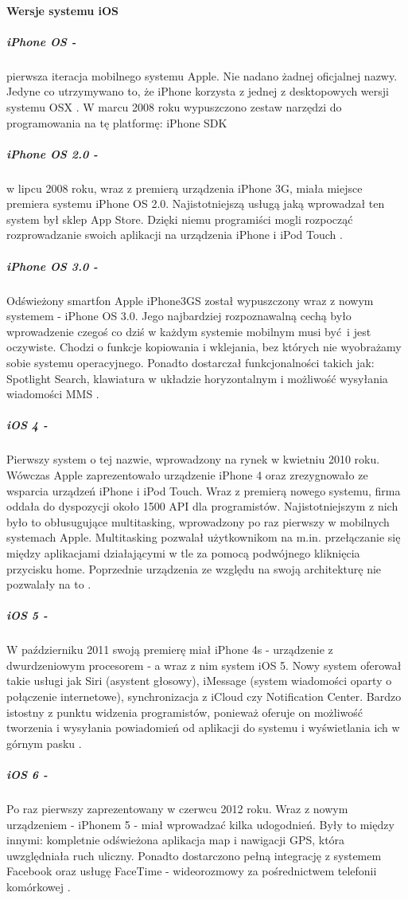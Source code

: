 \documentclass[12pt,oneside,a4paper]{report}
\begin{document}
\paragraph{Wersje systemu iOS}
\subparagraph{iPhone OS -}pierwsza iteracja mobilnego systemu Apple. Nie nadano żadnej oficjalnej nazwy. Jedyne co utrzymywano to, że iPhone korzysta z jednej z desktopowych wersji systemu OSX \cite{iphoneOSX}. 
W marcu 2008 roku wypuszczono zestaw narzędzi do programowania na tę platformę: iPhone SDK \cite{iphoneSDK}
\subparagraph{iPhone OS 2.0 -}w lipcu 2008 roku, wraz z premierą urządzenia iPhone 3G, miała miejsce premiera systemu iPhone OS 2.0. Najistotniejszą usługą jaką wprowadzał ten system był sklep App Store. Dzięki niemu programiści mogli rozpocząć rozprowadzanie swoich aplikacji na urządzenia iPhone i iPod Touch  \cite{iphone3GappStore}.
\subparagraph{iPhone OS 3.0 -}Odświeżony smartfon Apple iPhone3GS został wypuszczony wraz z nowym systemem - iPhone OS 3.0. Jego najbardziej rozpoznawalną cechą było wprowadzenie czegoś co dziś w każdym systemie mobilnym musi być i jest oczywiste. Chodzi o funkcje kopiowania i wklejania, bez których nie wyobrażamy sobie systemu operacyjnego. Ponadto dostarczał funkcjonalności takich jak: Spotlight Search, klawiatura w układzie horyzontalnym i możliwość wysyłania wiadomości MMS \cite{iphoneOS3}.
\subparagraph{iOS 4 -}Pierwszy system o tej nazwie, wprowadzony na rynek w kwietniu 2010 roku. Wówczas Apple zaprezentowało urządzenie iPhone 4 oraz zrezygnowało ze wsparcia urządzeń iPhone i iPod Touch. Wraz z premierą nowego systemu, firma oddała do dyspozycji około 1500 API dla programistów. Najistotniejszym z nich było to obłusugujące multitasking, wprowadzony po raz pierwszy w mobilnych systemach Apple. Multitasking pozwalał użytkownikom na m.in. przełączanie się między aplikacjami działającymi w tle za pomocą podwójnego kliknięcia przycisku home. Poprzednie urządzenia ze względu na swoją architekturę nie pozwalały na to \cite{ios4}.
\subparagraph{iOS 5 -}W październiku 2011 swoją premierę miał iPhone 4s - urządzenie z dwurdzeniowym procesorem - a wraz z nim system iOS 5. Nowy system oferował takie usługi jak Siri (asystent głosowy), iMessage (system wiadomości oparty o połączenie internetowe), synchronizacja z iCloud czy Notification Center. Bardzo istostny z punktu widzenia programistów, ponieważ oferuje on możliwość tworzenia i wysyłania powiadomień od aplikacji do systemu i wyświetlania ich w górnym pasku \cite{ios5}.
\subparagraph{iOS 6 -}Po raz pierwszy zaprezentowany w czerwcu 2012 roku. Wraz z nowym urządzeniem - iPhonem 5 - miał wprowadzać kilka udogodnień. Były to między innymi: kompletnie odświeżona aplikacja map i nawigacji GPS, która uwzględniała ruch uliczny. Ponadto dostarczono pełną integrację z systemem Facebook oraz usługę FaceTime - wideorozmowy za pośrednictwem telefonii komórkowej \cite{ios6}.
\end{document}
